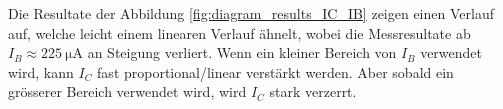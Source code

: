\documentclass[../main.tex]{subfiles}
\begin{document}
Die Resultate der Abbildung \ref{fig:diagram_results_IC_IB} zeigen einen Verlauf auf, welche leicht einem linearen Verlauf ähnelt, wobei die Messresultate ab $I_B  \approx\SI{225}{\micro\ampere}$ an Steigung verliert. Wenn ein kleiner Bereich von $I_B$ verwendet wird, kann $I_C$ fast proportional/linear verstärkt werden. Aber sobald ein grösserer Bereich verwendet wird, wird $I_C$ stark verzerrt.
\end{document}
